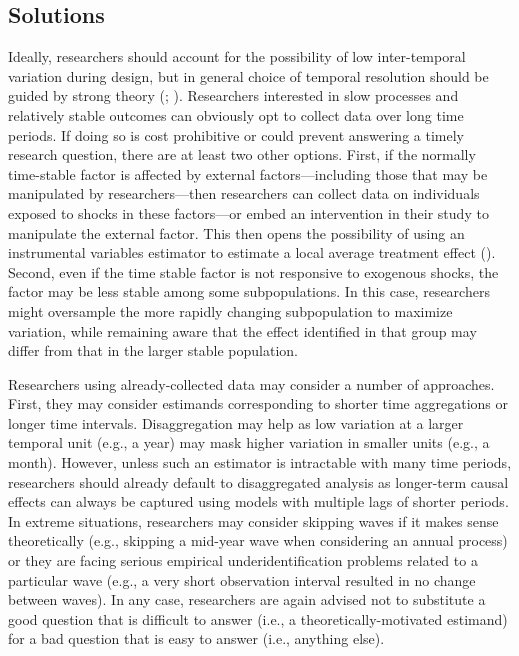 \documentclass[
  letterpaper,
  DIV=11,
  numbers=noendperiod]{scrartcl}
\begin{document}
\subsection{Solutions}\label{solutions-2}

Ideally, researchers should account for the possibility of low
inter-temporal variation during design, but in general choice of
temporal resolution should be guided by strong theory
(;
). Researchers
interested in slow processes and relatively stable outcomes can
obviously opt to collect data over long time periods. If doing so is
cost prohibitive or could prevent answering a timely research question,
there are at least two other options. First, if the normally time-stable
factor is affected by external factors---including those that may be
manipulated by researchers---then researchers can collect data on
individuals exposed to shocks in these factors---or embed an
intervention in their study to manipulate the external factor. This then
opens the possibility of using an instrumental variables estimator to
estimate a local average treatment effect
(). Second, even
if the time stable factor is not responsive to exogenous shocks, the
factor may be less stable among some subpopulations. In this case,
researchers might oversample the more rapidly changing subpopulation to
maximize variation, while remaining aware that the effect identified in
that group may differ from that in the larger stable population.

Researchers using already-collected data may consider a number of
approaches. First, they may consider estimands corresponding to shorter
time aggregations or longer time intervals. Disaggregation may help as
low variation at a larger temporal unit (e.g., a year) may mask higher
variation in smaller units (e.g., a month). However, unless such an
estimator is intractable with many time periods, researchers should
already default to disaggregated analysis as longer-term causal effects
can always be captured using models with multiple lags of shorter
periods. In extreme situations, researchers may consider skipping waves
if it makes sense theoretically (e.g., skipping a mid-year wave when
considering an annual process) or they are facing serious empirical
underidentification problems related to a particular wave (e.g., a very
short observation interval resulted in no change between waves). In any
case, researchers are again advised not to substitute a good question
that is difficult to answer (i.e., a theoretically-motivated estimand)
for a bad question that is easy to answer (i.e., anything else).
\end{document}

